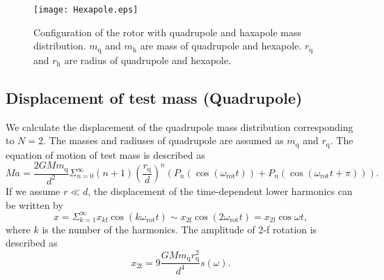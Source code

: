 \documentclass[A4]{spie}  %
\begin{document}
\begin{figure}
\begin{center}
\texttt{[image: Hexapole.eps]}
\caption{Configuration of the rotor with quadrupole and haxapole mass distribution. $m_{\mathrm{q}}$ and $m_{\mathrm{h}}$ are mass of quadrupole and hexapole. $r_{\mathrm{q}}$ and $r_{\mathrm{h}}$ are radius of quadrupole and hexapole.}
\label{fig:hex}
\end{center}
\end{figure}

\subsection{Displacement of test mass (Quadrupole)} \label{Quad}
We calculate the displacement of the quadrupole mass distribution corresponding to $N=2$.
The masses and radiuses of quadrupole are assumed as $m_{\mathrm{q}}$ and $r_{\mathrm{q}}$. 
The equation of motion of test mass is described as
\begin{equation}
Ma=\frac{2GMm_{\mathrm{q}}}{d^2}\Sigma^{\infty}_{n=0}(n+1) \left( \frac{r_{\mathrm{q}}}{d} \right)^n \left( P_n\left(\cos{\left(\omega_{\mathrm{rot}} t \right)}\right) + P_n\left(\cos{\left(\omega_{\mathrm{rot}} t +\pi \right)}\right) \right).
\end{equation} 
If we assume $r \ll d$, the displacement of the time-dependent lower harmonics can be written by 
\begin{equation}
x=\Sigma_{k=1}^{\infty}x_{k\mathrm{f}}\cos(k\omega_{\mathrm{rot}} t)\sim x_{\mathrm{2f}}\cos(2\omega_{\mathrm{rot}} t)=x_{\mathrm{2f}}\cos{\omega t},
\end{equation}
where $k$ is the number of the harmonics. 
The amplitude of 2-f rotation is described as
\begin{equation}
x_{2\mathrm{f}}=9\frac{GMm_{\mathrm{q}}r_{\mathrm{q}}^2}{d^4}s(\omega). \label{2f}
\end{equation}
\end{document}
